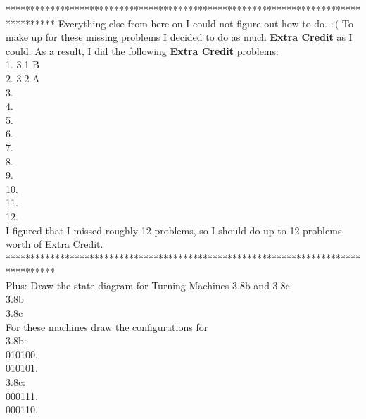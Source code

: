 \documentclass[12pt]{article}
\begin{document}
\pagebreak
**********************************************************************************
Everything else from here on I could not figure out how to do. $:($
To make up for these missing problems I decided to do as much \textbf{Extra Credit}
as I could. As a result, I did the following \textbf{Extra Credit} problems: \\

 1. 3.1 B \\
 2. 3.2 A \\
 3.  \\
 4.  \\
 5.  \\
 6.  \\
 7.  \\
 8.  \\ 
 9.  \\
10.  \\ 
11.  \\
12.  \\

I figured that I missed roughly 12 problems, so I should do up to 12 problems
worth of Extra Credit. \\

********************************************************************************** \\

\pagebreak
Plus: Draw the state diagram for Turning Machines 3.8b and 3.8c \\
3.8b \\

3.8c \\

For these machines draw the configurations for \\
3.8b: \\
010100. \\

010101. \\

3.8c: \\
000111. \\

000110. \\

\pagebreak
\end{document}

